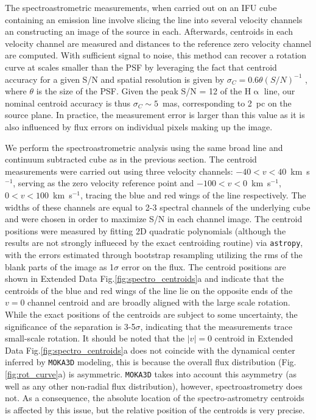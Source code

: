 \documentclass[twocolumn, fleqn]{doc_class}
\newcommand{\Halpha}{\ensuremath{\mathrm{H}\upalpha}\xspace}
\begin{document}
The spectroastrometric measurements, when carried out on an IFU cube containing an emission line involve slicing the line into several velocity channels an constructing an image of the source in each. Afterwards, centroids in each velocity channel are measured and distances to the reference zero velocity channel are computed. With sufficient signal to noise, this method can recover a rotation curve at scales smaller than the PSF by leveraging the fact that centroid accuracy for a given S/N and spatial resolution is given by $\sigma_C = 0.6\theta(S/N)^{-1}$ , where $\theta$ is the size of the PSF. Given the peak S/N = 12 of the \Halpha line, our nominal centroid accuracy is thus $\sigma_C \sim 5$~mas, corresponding to 2~pc on the source plane. In practice, the measurement error is larger than this value as it is also influenced by flux errors on individual pixels making up the image.

We perform the spectroastrometric analysis using the same broad line and continuum subtracted cube as in the previous section. The centroid measurements were carried out using three velocity channels: $-40 < v < 40$~km~s$^{-1}$, serving as the zero velocity reference point and $-100 < v < 0$~km~s$^{-1}$, $0 < v < 100$~km~s$^{-1}$, tracing the blue and red wings of the line respectively. The widths of these channels are equal to 2-3 spectral channels of the underlying cube and were chosen in order to maximize S/N in each channel image. The centroid positions were measured by fitting 2D quadratic polynomials (although the results are not strongly influeced by the exact centroiding routine) via \texttt{astropy}, with the errors estimated through bootstrap resampling utilizing the rms of the blank parts of the image as 1$\sigma$ error on the flux. The centroid positions are shown in Extended Data Fig.\ref{fig:spectro_centroids}a and indicate that the centroids of the blue and red wings of the line lie on the opposite ends of the $v = 0$ channel centroid and are broadly aligned with the large scale rotation. While the exact positions of the centroids are subject to some uncertainty, the significance of the separation is 3-5$\sigma$, indicating that the measurements trace small-scale rotation. It should be noted that the $|v| = 0$ centroid in Extended Data Fig.\ref{fig:spectro_centroids}a does not coincide with the dynamical center inferred by \texttt{MOKA3D} modeling, this is because the overall flux distribution (Fig. \ref{fig:rot_curve}a) is asymmetric. \texttt{MOKA3D} takes into account this asymmetry (as well as any other non-radial flux distribution), however, spectroastrometry does not. As a consequence, the absolute location of the spectro-astrometry centroids is affected by this issue, but the relative position of the centroids is very precise.
\end{document}
